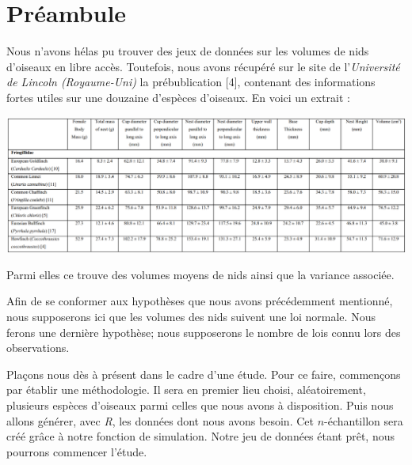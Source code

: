 \documentclass[frenchb]{report}
\newcommand{\1}{\mathbbm{1}}
\theoremstyle{definition}\newtheorem{defn}{Définition}
\theoremstyle{definition}\newtheorem{exm}{Exemple}
\theoremstyle{definition}\newtheorem{nota}{Notation}
\theoremstyle{definition}\newtheorem{rem}{Remarque}
\begin{document}
\section{Préambule}

Nous n'avons hélas pu trouver des jeux de données sur les volumes de nids d'oiseaux en libre accès. Toutefois, nous avons récupéré sur le site de l'\textit{Université de Lincoln (Royaume-Uni)} la prébublication [4], contenant des informations fortes utiles sur une douzaine d'espèces d'oiseaux.
En voici un extrait :
\begin{center}
\includegraphics[scale = 0.5]{tab_oiseaux.png}
\end{center}

Parmi elles ce trouve des volumes moyens de nids ainsi que la variance associée. \newline


Afin de se conformer aux hypothèses que nous avons précédemment mentionné, nous supposerons ici que les volumes des nids suivent une loi normale. Nous ferons une dernière hypothèse; nous supposerons le nombre de lois connu lors des observations. \newline

Plaçons nous dès à présent dans le cadre d'une étude. Pour ce faire, commençons par établir une méthodologie. 
Il sera en premier lieu choisi, aléatoirement, plusieurs espèces d'oiseaux parmi celles que nous avons à disposition. Puis nous allons générer, avec \textit{R}, les données dont nous avons besoin. Cet $n$-échantillon sera créé grâce à notre fonction de simulation. Notre jeu de données étant prêt, nous pourrons commencer l'étude. \newline
\end{document}
